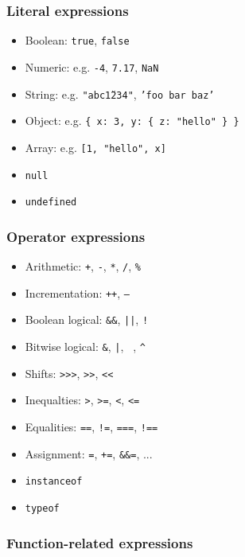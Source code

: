 \documentclass{article}
\begin{document}
\begin{multicols}{2}
\subsubsection*{Literal expressions}

\begin{itemize}
  \item Boolean: \texttt{true}, \texttt{false}
  \item Numeric: e.g. \texttt{-4}, \texttt{7.17}, \texttt{NaN}
  \item String: e.g. \texttt{"abc\u1234"}, \texttt{'foo bar baz'}
  \item Object: e.g. \texttt{\{ x: 3, y: \{ z: "hello" \} \} }
  \item Array: e.g. \texttt{[1, "hello", x]}
  \item \texttt{null}
  \item \texttt{undefined}
\end{itemize}

\subsubsection*{Operator expressions}

\begin{itemize}
  \item Arithmetic: \texttt{+}, \texttt{-}, \texttt{*}, \texttt{/}, \texttt{\%}
  \item Incrementation: \texttt{++}, \texttt{--}
  \item Boolean logical: \texttt{\&\&}, \texttt{||}, \texttt{!}
  \item Bitwise logical: \texttt{\&}, \texttt{|}, \texttt{~}, \texttt{\^}
  \item Shifts: \texttt{>>>}, \texttt{>>}, \texttt{<<}
  \item Inequalties: \texttt{>}, \texttt{>=}, \texttt{<}, \texttt{<=}
  \item Equalities: \texttt{==}, \texttt{!=}, \texttt{===}, \texttt{!==}
  \item Assignment: \texttt{=}, \texttt{+=}, \texttt{\&\&=}, ...
  \item \texttt{instanceof}
  \item \texttt{typeof}
\end{itemize}

\subsubsection*{Function-related expressions}


\end{multicols}
\end{document}
